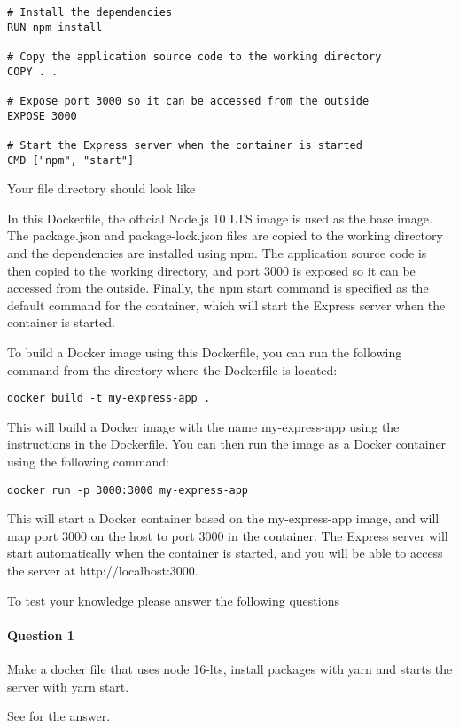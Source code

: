 {\begin{lstlisting}[language=docker, caption=Dockerfile for node application]
# Install the dependencies
RUN npm install

# Copy the application source code to the working directory
COPY . .

# Expose port 3000 so it can be accessed from the outside
EXPOSE 3000

# Start the Express server when the container is started
CMD ["npm", "start"]
\end{lstlisting}

Your file directory should look like


In this Dockerfile, the official Node.js 10 LTS image is used as the base image. The package.json and package-lock.json files are copied to the working directory and the dependencies are installed using npm. The application source code is then copied to the working directory, and port 3000 is exposed so it can be accessed from the outside. Finally, the npm start command is specified as the default command for the container, which will start the Express server when the container is started.

To build a Docker image using this Dockerfile, you can run the following command from the directory where the Dockerfile is located:

\begin{verbatim}
docker build -t my-express-app .
\end{verbatim}

This will build a Docker image with the name my-express-app using the instructions in the Dockerfile. You can then run the image as a Docker container using the following command:

\begin{verbatim}
docker run -p 3000:3000 my-express-app
\end{verbatim}

This will start a Docker container based on the my-express-app image, and will map port 3000 on the host to port 3000 in the container. The Express server will start automatically when the container is started, and you will be able to access the server at http://localhost:3000.



To test your knowledge please answer the following questions

\label{ex:5}
\paragraph{Question 1}
Make a docker file that uses node 16-lts, install packages with yarn and starts the server with yarn start.

See \pageref{sol:5} for the answer.


}\cleanalldata

